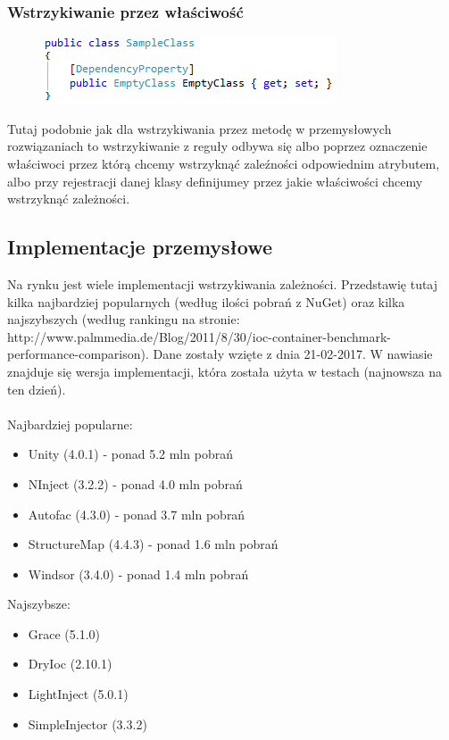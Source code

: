\documentclass[12pt]{article}
\begin{document}
\subsubsection{Wstrzykiwanie przez właściwość}
\begin{figure}[h]
	\begin{raggedleft}
  		\includegraphics{DependencyProperty.png}
	\end{raggedleft}
\end{figure}
Tutaj podobnie jak dla wstrzykiwania przez metodę w przemysłowych rozwiązaniach to wstrzykiwanie z reguły odbywa się albo poprzez oznaczenie właściwoci przez którą chcemy wstrzyknąć zaleźności odpowiednim atrybutem, albo przy rejestracji danej klasy definijumey przez jakie właściwości chcemy wstrzyknąć zależności.


\clearpage
\subsection{Implementacje przemysłowe}
Na rynku jest wiele implementacji wstrzykiwania zależności. Przedstawię tutaj kilka najbardziej popularnych (według ilości pobrań z NuGet) oraz kilka najszybszych (według rankingu na stronie: http://www.palmmedia.de/Blog/2011/8/30/ioc-container-benchmark-performance-comparison). Dane zostały wzięte z dnia 21-02-2017. W nawiasie znajduje się wersja implementacji, która została użyta w testach (najnowsza na ten dzień).\\
\\
Najbardziej popularne:
\begin{itemize}
	\item Unity (4.0.1) - ponad 5.2 mln pobrań
	\item NInject (3.2.2) - ponad 4.0 mln pobrań
	\item Autofac (4.3.0) - ponad 3.7 mln pobrań
	\item StructureMap (4.4.3) - ponad 1.6 mln pobrań
	\item Windsor (3.4.0) - ponad 1.4 mln pobrań
\end{itemize}
Najszybsze:
\begin{itemize}
	\item Grace (5.1.0)
	\item DryIoc (2.10.1)
	\item LightInject (5.0.1)
	\item SimpleInjector (3.3.2)
\end{itemize}
\end{document}
